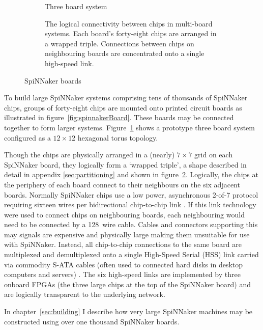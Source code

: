 \begin{figure}
\begin{subfigure}[b]{0.45\linewidth}
				\caption{Three board system}
				\label{fig:threeboard}
			\end{subfigure}
			
			\vspace*{2em}
			
			\begin{subfigure}{\linewidth}
				\center
				
				\caption{The logical connectivity between chips in multi-board systems.
				Each board's forty-eight chips are arranged in a wrapped triple.
				Connections between chips on neighbouring boards are concentrated onto
				a single high-speed link.}
				\label{fig:sata-connections}
			\end{subfigure}
			
			\caption{SpiNNaker boards}
			\label{fig:spinnaker-boards}
		\end{figure}
		
		To build large SpiNNaker systems comprising tens of thousands of
		SpiNNaker chips, groups of forty-eight chips are mounted onto printed
		circuit boards as illustrated in figure~\ref{fig:spinnakerBoard}. These
		boards may be connected together to form larger systems.
		Figure~\ref{fig:threeboard} shows a prototype three board system configured
		as a $12\times12$ hexagonal torus topology.
		
		Though the chips are physically arranged in a (nearly) $7\times7$ grid on
		each SpiNNaker board, they logically form a `wrapped triple', a shape
		described in detail in appendix \ref{sec:partitioning} and shown in
		figure~\ref{fig:sata-connections}. Logically, the chips at the periphery of
		each board connect to their neighbours on the six adjacent boards.
		Normally SpiNNaker chips use a low power, asynchronous 2-of-7 protocol
		requiring sixteen wires per bidirectional chip-to-chip link
		\cite{bainbridge03}. If this link technology were used to connect chips on
		neighbouring boards, each neighbouring would need to be connected by a
		128~wire cable. Cables and connectors supporting this may signals are
		expensive and physically large making them unsuitable for use with
		SpiNNaker. Instead, all chip-to-chip connections to the same board are
		multiplexed and demultiplexed onto a single High-Speed Serial (HSS) link
		\cite{athavale05} carried via commodity S-ATA cables (often used to
		connected hard disks in desktop computers and servers) \cite{sata3spec}.
		The six high-speed links are implemented by three onboard FPGAs (the three
		large chips at the top of the SpiNNaker board) and are logically
		transparent to the underlying network.
		
		In chapter~\ref{sec:building} I describe how very large SpiNNaker machines
		may be constructed using over one thousand SpiNNaker boards.
